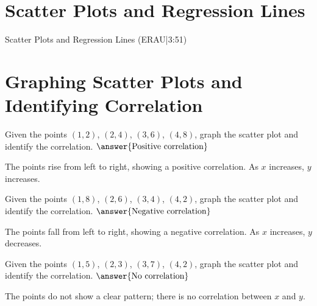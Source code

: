 \documentclass{ximera}
\begin{document}

\section*{Scatter Plots and Regression Lines}

Scatter Plots and Regression Lines (ERAU|3:51)



\section*{Graphing Scatter Plots and Identifying Correlation}

\begin{problem}
Given the points $(1, 2)$, $(2, 4)$, $(3, 6)$, $(4, 8)$, graph the scatter plot and identify the correlation. $\answer{\text{Positive correlation}}$
\begin{feedback}
The points rise from left to right, showing a positive correlation. As $x$ increases, $y$ increases.
\end{feedback}
\end{problem}

\begin{problem}
Given the points $(1, 8)$, $(2, 6)$, $(3, 4)$, $(4, 2)$, graph the scatter plot and identify the correlation. $\answer{\text{Negative correlation}}$
\begin{feedback}
The points fall from left to right, showing a negative correlation. As $x$ increases, $y$ decreases.
\end{feedback}
\end{problem}

\begin{problem}
Given the points $(1, 5)$, $(2, 3)$, $(3, 7)$, $(4, 2)$, graph the scatter plot and identify the correlation. $\answer{\text{No correlation}}$
\begin{feedback}
The points do not show a clear pattern; there is no correlation between $x$ and $y$.
\end{feedback}
\end{problem}

\end{document}

